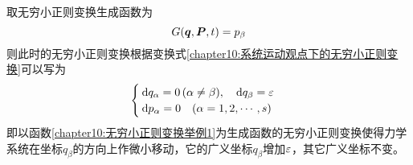 \begin{example}%
取无穷小正则变换生成函数为
\begin{equation}
	G(\boldsymbol{q},\boldsymbol{P},t) = p_\beta
	\label{chapter10:无穷小正则变换举例1}
\end{equation}
则此时的无穷小正则变换根据变换式\eqref{chapter10:系统运动观点下的无穷小正则变换}可以写为
\begin{equation}
\begin{cases}
	\mathrm{d} q_\alpha = 0\,(\alpha\neq\beta),\quad \mathrm{d} q_\beta = \varepsilon \\
	\mathrm{d} p_\alpha = 0\quad (\alpha=1,2,\cdots,s)
\end{cases}
\end{equation}
即以函数\eqref{chapter10:无穷小正则变换举例1}为生成函数的无穷小正则变换使得力学系统在坐标$q_\beta$的方向上作微小移动，它的广义坐标$q_\beta$增加$\varepsilon$，其它广义坐标不变。

\end{example}


